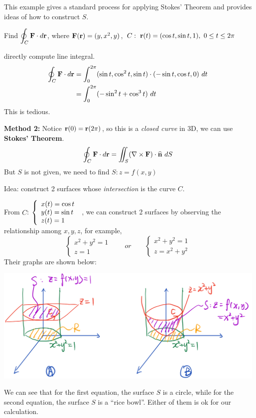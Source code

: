 \begin{spacing}{1.3}
    \newpage
    {\blue This example gives a standard process for applying Stokes' Theorem and provides ideas of 
    how to construct $S$.}

    \eg Find $\displaystyle \oint_C {\bf F}\cdot d{\bf r}$, where ${\bf F}({\bf r})=(y,x^2,y)$, $C:\ {\bf r}(t)=(\cos t, \sin t, 1),
    \ 0\le t\le 2\pi$

     directly compute line integral.
    \begin{align*}
        \oint_C {\bf F}\cdot d{\bf r} &= \int_0^{2\pi} (\sin t, \cos^2 t, \sin t)\cdot (-\sin t, \cos t,0)\ dt\\
        &= \int_0^{2\pi} (-\sin^2 t+\cos^3 t)\ dt
    \end{align*}
    This is tedious.
    
    \vspace{0.3in}
    {\bf Method 2:}
    Notice ${\bf r}(0)={\bf r}(2\pi)$, so this is a {\it closed curve} in 3D, we can use {\bf Stokes' Theorem}.
    $$\oint_C {\bf F}\cdot d{\bf r} =\iint_S (\nabla\times {\bf F})\cdot \widehat{\bf n} \ dS$$
    {\blue But $S$ is not given, we need to find $S: z=f(x,y)$}

    {\blue Idea: construct 2 surfaces whose {\it intersection} is the curve $C$}.

    From $C$: $\displaystyle \left\{\begin{array}{l}
        x(t)=\cos t\\ y(t)=\sin t\\ z(t)=1
    \end{array} \right.$
    , we can construct 2 surfaces by observing the relationship among $x,y,z$, for example,
    $$\left\{\begin{array}{l}
        x^2+y^2=1\\ z=1
    \end{array} \right. \qquad or \qquad 
    \left\{\begin{array}{l}
        x^2+y^2=1\\ z=x^2+y^2
    \end{array} \right.$$
    Their graphs are shown below:
    \begin{center}
        \includegraphics[scale=0.24]{images/Ch16-Stoke-eg.jpeg}
    \end{center}
    We can see that for the first equation, the surface $S$ is a circle, while for the second equation,
    the surface $S$ is a ``rice bowl''. Either of them is ok for our calculation.


\end{spacing}
